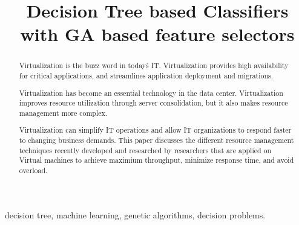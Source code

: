 \documentclass[conference]{IEEEtran}
\begin{document}
\title{Decision Tree based Classifiers with GA based feature selectors}


\author{
\and
{}
\and
{}
}




\maketitle


\begin{abstract}
Virtualization is the buzz word in today\'s IT. Virtualization provides high availability for critical applications, and streamlines application deployment and migrations.

 
Virtualization has become an essential technology in the data center. Virtualization improves resource utilization through server consolidation, but it also makes resource management more complex. 


Virtualization can simplify IT operations and allow IT organizations to respond faster to changing business demands. This paper discusses the different resource management  techniques recently developed and researched by researchers that are applied on Virtual machines to achieve maximium throughput, minimize response time, and avoid overload.
\end{abstract}
\begin{keywords}
decision tree, machine learning, genetic algorithms, decision problems.
\end{keywords}

\IEEEpeerreviewmaketitle
\end{document}
